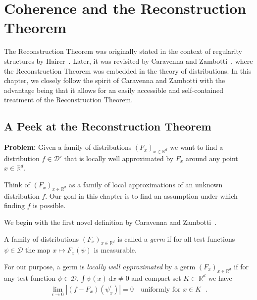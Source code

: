 \chapter{Coherence and the Reconstruction Theorem}\label{chapter:reconstruction}

The Reconstruction Theorem was originally stated in the context of regularity structures by Hairer~\cite{hairer2014theory}. Later, it was revisited by Caravenna and Zambotti~\cite{caravenna2021hairer}, where the Reconstruction Theorem was embedded in the theory of distributions. In this chapter, we closely follow the spirit of Caravenna and Zambotti with the advantage being that it allows for an easily accessible and self-contained treatment of the Reconstruction Theorem.

\section{A Peek at the Reconstruction Theorem}\label{chapter:first-peek-at-reconstruction}

\textbf{Problem:} Given a family of distributions \({(F_x)}_{x \in \mathbb{R}^d}\) we want to find a distribution \(f \in \mathcal{D'}\) that is locally well approximated by \(F_x\) around any point \(x \in \mathbb{R}^d\).

\vspace{0.2cm}

Think of \({(F_x)}_{x \in \mathbb{R}^d}\) as a family of local approximations of an unknown distribution \(f\). Our goal in this chapter is to find an assumption under which finding \(f\) is possible. 

We begin with the first novel definition by Caravenna and Zambotti~\cite{caravenna2021hairer}.
\begin{definition}[Germ]
    A family of distributions \({(F_x)}_{x \in \mathbb{R}^d}\) is called a \emph{germ} if for all test functions \(\psi \in \mathcal{D}\) the map \(x \mapsto F_x(\psi)\) is measurable.
\end{definition}

For our purpose, a germ is \emph{locally well approximated} by a germ \({(F_x)}_{x \in \mathbb{R}^d}\) if for any test function \(\psi \in \mathcal{D}, \int \psi(x)\, \mathrm{d}x \neq 0\) and compact set \(K \subset \mathbb{R}^d\) we have 
\begin{align}\label{peek:well-approximated}
    \lim_{\epsilon \to 0} |(f - F_x)(\psi^\epsilon_x)| = 0 \quad \text{uniformly for \(x \in K\) }.
\end{align} 

